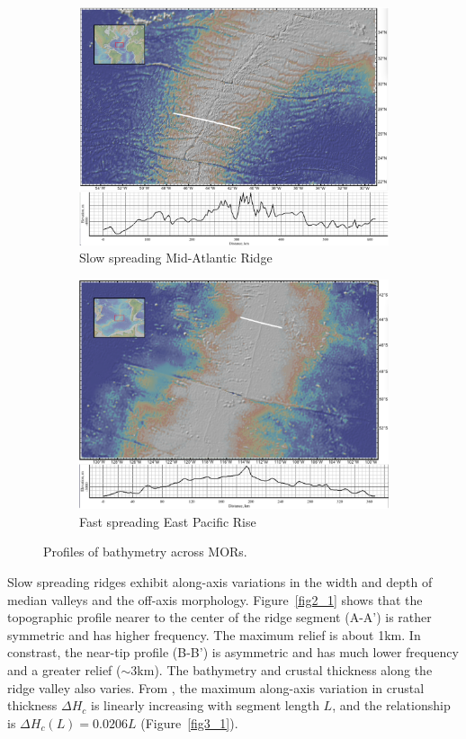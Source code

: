 \documentclass[12pt]{article}
\begin{document}
\begin{figure}[H]
\centering
\begin{subfigure}{.5\textwidth}
  \centering
  \includegraphics[width=.8\linewidth]{fig1_1.png}
  \caption{\small{Slow spreading Mid-Atlantic Ridge}}
  \label{fig1_1}
\end{subfigure}%
\begin{subfigure}{.5\textwidth}
  \centering
  \includegraphics[width=.8\linewidth]{fig1_3.png}
  \caption{\small{Fast spreading East Pacific Rise}}
  \label{fig1_3}
\end{subfigure}
\caption{\small{Profiles of bathymetry across MORs.}}
\label{fig1}
\end{figure}
Slow spreading ridges exhibit along-axis variations in the width and depth of median valleys and the off-axis morphology.  Figure~\ref{fig2_1} shows that the topographic profile nearer to the center of the ridge segment (A-A') is rather symmetric and has higher frequency. The maximum relief is about 1km. In constrast, the near-tip profile (B-B') is asymmetric and has much lower frequency and a greater relief ($\sim$3km). The bathymetry and crustal thickness along the ridge valley also varies. From \citep{Chen1999}, the maximum along-axis variation in crustal thickness $\Delta H_{c}$ is linearly increasing with segment length $L$, and the relationship is $\Delta H_{c}(L)=0.0206L$ (Figure~\ref{fig3_1}).
\end{document}
